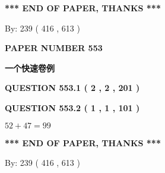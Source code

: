 \documentclass{ctexart}
\begin{document}
   
 \vspace{0.2in}
 
   
   
   
   
\vspace{1.0in} 
{\textbf{\large{ *** END OF PAPER, THANKS *** }}} 
   
   
\hspace{1.0in} By: 
 239 ( 416 ,  613 )
   
   
   
   
\newpage 
\setcounter{page}{ 
   553001 } 
   
   
   
   
 {\textbf{ \Large{ PAPER NUMBER  553  }}}
   
   
\vspace{0.2in}
   
   
   
   
   
   
 \vspace{0.2in}
{\LARGE {\textbf{ 一个快速卷例}}}
   
   
  
\vspace{0.2in}
  
{\textbf{\Large{QUESTION
553.1 
 ( 2 , 2 , 201 )
}}}
  
  
  
\vspace{0.2in}
  
{\textbf{\Large{QUESTION
553.2 
 ( 1 , 1 , 101 )
}}}
  
  
 
 

$ %
52 +  %
47=   %
99$
 
 
   
   
 \vspace{0.2in}
 
   
   
   
   
\vspace{1.0in} 
{\textbf{\large{ *** END OF PAPER, THANKS *** }}} 
   
   
\hspace{1.0in} By: 
 239 ( 416 ,  613 )
   
   
   
   
\newpage 
\setcounter{page}{ 
   554001 } 
   
   
   
\end{document}

